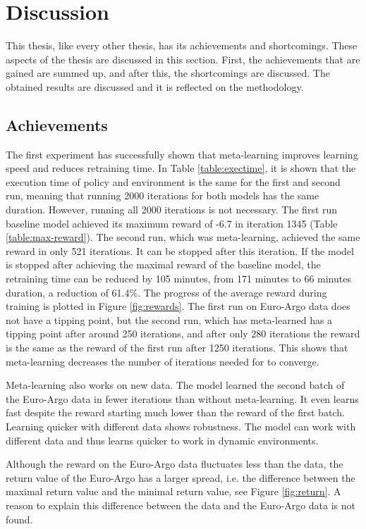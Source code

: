 \chapter{Discussion}\label{sec:discussion}

This thesis, like every other thesis, has its achievements and shortcomings.
These aspects of the thesis are discussed in this section. First, the
achievements that are gained are summed up, and after this, the shortcomings
are discussed. The obtained results are discussed and it is reflected on the
methodology.

\section{Achievements}

The first experiment has successfully shown that meta-learning improves
learning speed and reduces retraining time. In Table \ref{table:exectime}, it
is shown that the execution time of policy and environment is the same for the
first and second run, meaning that running 2000 iterations for both models has
the same duration. However, running all 2000 iterations is not necessary. The
first run baseline model achieved its maximum reward of -6.7 in iteration 1345
(Table \ref{table:max-reward}). The second run, which was meta-learning,
achieved the same reward in only 521 iterations. It can be stopped after this
iteration. If the model is stopped after achieving the maximal reward of the
baseline model, the retraining time can be reduced by 105 minutes, from 171
minutes to 66 minutes duration, a reduction of 61.4\%. The progress of the
average reward during training is plotted in Figure \ref{fig:rewards}. The
first run on Euro-Argo data does not have a tipping point, but the second run,
which has meta-learned has a tipping point after around 250 iterations, and
after only 280 iterations the reward is the same as the reward of the first
run after 1250 iterations. This shows that meta-learning decreases the number
of iterations needed for \mrlco to converge.

Meta-learning also works on new data. The model learned the second batch of
the Euro-Argo data in fewer iterations than without meta-learning. It even
learns fast despite the reward starting much lower than the reward of the
first batch. Learning quicker with different data shows robustness. The model
can work with different data and thus learns quicker to work in dynamic
environments.

Although the reward on the Euro-Argo data fluctuates less than the \mrlco
data, the return value of the Euro-Argo has a larger spread, i.e. the
difference between the maximal return value and the minimal return value, see
Figure \ref{fig:return}. A reason to explain this difference between the
\mrlco data and the Euro-Argo data is not found.

